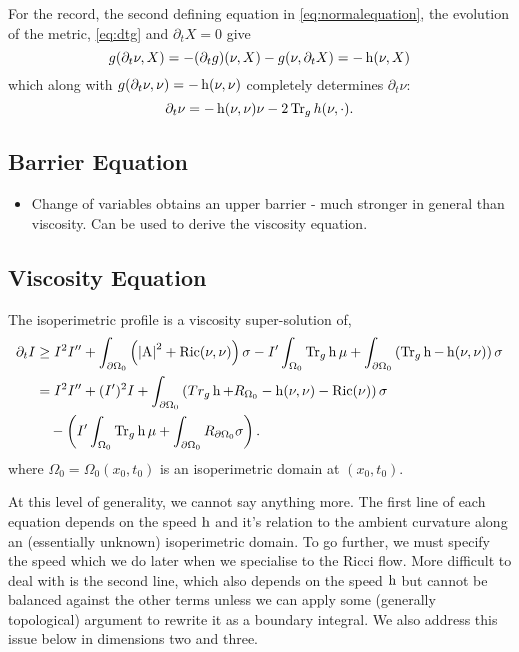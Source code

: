 \documentclass{amsart}
\begin{document}
\begin{rem}
For the record, the second defining equation in \eqref{eq:normalequation}, the evolution of the metric, \eqref{eq:dtg} and \(\partial_t X = 0\) give
\[
g(\partial_t \nu, X) = -(\partial_t g) (\nu, X) - g(\nu, \partial_t X) = -\operatorname{h}(\nu, X)
\]
which along with \(g(\partial_t \nu, \nu) = - \operatorname{h}(\nu, \nu)\) completely determines \(\partial_t \nu\):
\[
\partial_t \nu = -\operatorname{h}(\nu, \nu) \nu - 2\operatorname{Tr}_g h(\nu, \cdot).
\]
\end{rem}

\subsection{Barrier Equation}

\begin{itemize}
\item Change of variables obtains an upper barrier - much stronger in general than viscosity. Can be used to derive the viscosity equation.
\end{itemize}

\subsection{Viscosity Equation}
\label{subsec:iso_diff_ineq_viscosity}

\begin{thm}
\label{thm:general_viscosity}
The isoperimetric profile is a viscosity super-solution of,
\[
\begin{split}
\partial_t I &\geq I^2 I'' +  \int_{\partial {\Omega_0}} \left(\left|{\operatorname{A}}\right|^2 + \operatorname{Ric}(\nu, \nu)\right) \sigma  - I'\int_{\Omega_0} \operatorname{Tr}_g \operatorname{h} \mu + \int_{\partial {\Omega_0}} \left(\operatorname{Tr}_g \operatorname{h} - \operatorname{h}(\nu, \nu)\right) \sigma \\
&= I^2 I'' +  (I')^2 I + \int_{\partial {\Omega_0}} \left(Tr_g \operatorname{h} + R_{\Omega_0} - \operatorname{h}(\nu, \nu) - \operatorname{Ric}(\nu)\right) \sigma \\
&\quad - \left(I'\int_{\Omega_0} \operatorname{Tr}_g \operatorname{h} \mu + \int_{\partial {\Omega_0}} R_{\partial {\Omega_0}}\sigma \right) .
\end{split}
\]
where \(\Omega_0 = \Omega_0(x_0, t_0)\) is an isoperimetric domain at \((x_0, t_0)\).
\end{thm}

\begin{rem}
At this level of generality, we cannot say anything more. The first line of each equation depends on the speed \(\operatorname{h}\) and it's relation to the ambient curvature along an (essentially unknown) isoperimetric domain. To go further, we must specify the speed which we do later when we specialise to the Ricci flow. More difficult to deal with is the second line, which also depends on the speed \(\operatorname{h}\) but cannot be balanced against the other terms unless we can apply some (generally topological) argument to rewrite it as a boundary integral. We also address this issue below in dimensions two and three.
\end{rem}
\end{document}
